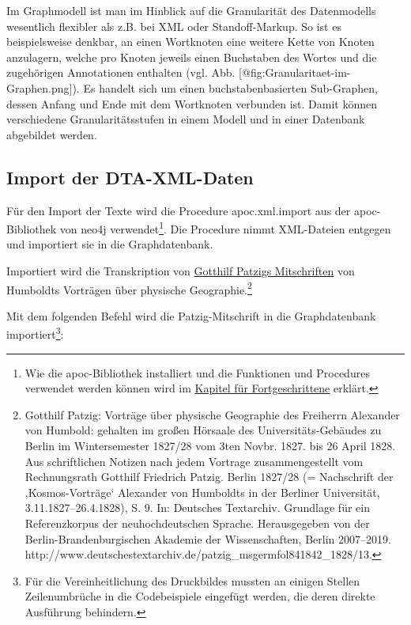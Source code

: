 Im Graphmodell ist man im Hinblick auf die Granularität des Datenmodells
wesentlich flexibler als z.B. bei XML oder Standoff-Markup. So ist es
beispielsweise denkbar, an einen Wortknoten eine weitere Kette von
Knoten anzulagern, welche pro Knoten jeweils einen Buchstaben des Wortes
und die zugehörigen Annotationen enthalten (vgl. Abb.
{[}@fig:Granularitaet-im-Graphen.png{]}). Es handelt sich um einen
buchstabenbasierten Sub-Graphen, dessen Anfang und Ende mit dem
Wortknoten verbunden ist. Damit können verschiedene Granularitätsstufen
in einem Modell und in einer Datenbank abgebildet werden.

\hypertarget{import-der-dta-xml-daten}{%
\subsection{Import der DTA-XML-Daten}\label{import-der-dta-xml-daten}}

Für den Import der Texte wird die Procedure apoc.xml.import aus der
apoc-Bibliothek von neo4j verwendet\footnote{Wie die apoc-Bibliothek
  installiert und die Funktionen und Procedures verwendet werden können
  wird im \href{85-cypher-fuer-Fortgeschrittene.md}{Kapitel für
  Fortgeschrittene} erklärt.}. Die Procedure nimmt XML-Dateien entgegen
und importiert sie in die Graphdatenbank.

Importiert wird die Transkription von
\href{http://www.deutschestextarchiv.de/patzig_msgermfol841842_1828/13}{Gotthilf
Patzigs Mitschriften} von Humboldts Vorträgen über physische
Geographie.\footnote{Gotthilf Patzig: Vorträge über physische Geographie
  des Freiherrn Alexander von Humbold: gehalten im großen Hörsaale des
  Universitäts-Gebäudes zu Berlin im Wintersemester 1827/28 vom 3ten
  Novbr. 1827. bis 26 April 1828. Aus schriftlichen Notizen nach jedem
  Vortrage zusammengestellt vom Rechnungsrath Gotthilf Friedrich Patzig.
  Berlin 1827/28 (= Nachschrift der ‚Kosmos-Vorträge` Alexander von
  Humboldts in der Berliner Universität, 3.11.1827--26.4.1828), S. 9.
  In: Deutsches Textarchiv. Grundlage für ein Referenzkorpus der
  neuhochdeutschen Sprache. Herausgegeben von der
  Berlin-Brandenburgischen Akademie der Wissenschaften, Berlin
  2007--2019.
  http://www.deutschestextarchiv.de/patzig\_msgermfol841842\_1828/13.}

Mit dem folgenden Befehl wird die Patzig-Mitschrift in die
Graphdatenbank importiert\footnote{Für die Vereinheitlichung des
  Druckbildes mussten an einigen Stellen Zeilenumbrüche in die
  Codebeispiele eingefügt werden, die deren direkte Ausführung
  behindern.}:

